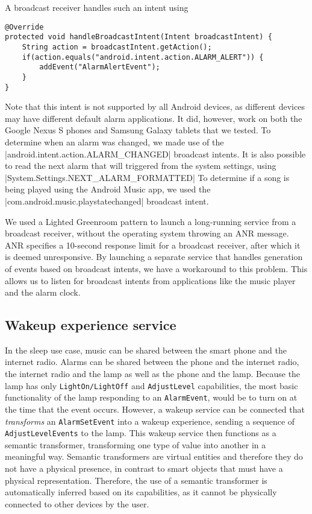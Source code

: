 A broadcast receiver handles such an intent using 

\begin{verbatim}
@Override
protected void handleBroadcastIntent(Intent broadcastIntent) {
	String action = broadcastIntent.getAction();
	if(action.equals("android.intent.action.ALARM_ALERT")) {
		addEvent("AlarmAlertEvent");
	}
}
\end{verbatim}
	
Note that this intent is not supported by all Android devices, as different devices may have different default alarm applications. It did, however, work on both the Google Nexus S phones and Samsung Galaxy tablets that we tested. To determine when an alarm was changed, we made use of the |android.intent.action.ALARM_CHANGED| broadcast intents. It is also possible to read the next alarm that will triggered from the system settings, using |System.Settings.NEXT_ALARM_FORMATTED| To determine if a song is being played using the Android Music app, we used the |com.android.music.playstatechanged| broadcast intent.

We used a Lighted Greenroom \cite{Komatineni2011} pattern to launch a long-running service from a broadcast receiver, without the operating system throwing an \ac{ANR} message. \ac{ANR} specifies a 10-second response limit for a broadcast receiver, after which it is deemed unresponsive. By launching a separate service that handles generation of events based on broadcast intents, we have a workaround to this problem. This allows us to listen for broadcast intents from applications like the music player and the alarm clock.

\subsection{Wakeup experience service}

In the sleep use case, music can be shared between the smart phone and the internet radio. Alarms can be shared between the phone and the internet radio, the internet radio and the lamp as well as the phone and the lamp. Because the lamp has only \texttt{LightOn/LightOff} and \texttt{AdjustLevel} capabilities, the most basic functionality of the lamp responding to an \texttt{AlarmEvent}, would be to turn on at the time that the event occurs. However, a wakeup service can be connected that \emph{transforms} an \texttt{AlarmSetEvent} into a wakeup experience, sending a sequence of \texttt{AdjustLevelEvents} to the lamp. This wakeup service then functions as a semantic transformer, transforming one type of value into another in a meaningful way. Semantic transformers are virtual entities and therefore they do not have a physical presence, in contrast to smart objects that must have a physical representation. Therefore, the use of a semantic transformer is automatically inferred based on its capabilities, as it cannot be physically connected to other devices by the user. 

